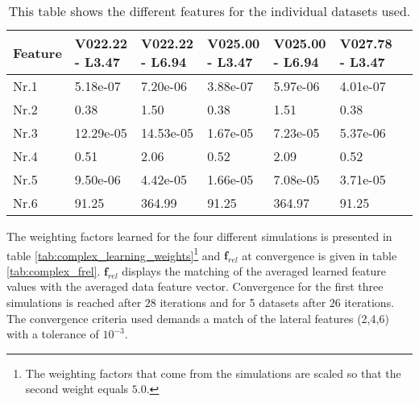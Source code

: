 \begin{table}[h!]
	\centering
	\begin{tabular}{@{}llllllr@{}} \toprule
	\textbf{Feature}     & V022.22 - L3.47 & 	V022.22 - L6.94 & V025.00 - L3.47 &	V025.00 - L6.94 & V027.78 - L3.47\\ \midrule
		Nr.1       		  &5.18e-07 &7.20e-06  	& 3.88e-07     & 5.97e-06  & 4.01e-07\\
		Nr.2              & 0.38 &1.50&	     0.38      & 1.51    &       0.38       \\
		Nr.3              & 12.29e-05&14.53e-05	& 1.67e-05 &	7.23e-05 &5.37e-06\\
		Nr.4              & 0.51 &2.06&	         0.52 &          2.09   &   0.52    \\
		Nr.5              & 9.50e-06&4.42e-05   & 1.66e-05      & 7.08e-05  & 3.71e-05       \\
		Nr.6              & 91.25 &	364.99      &	91.25	&364.97       & 91.25       \\ \bottomrule
	\end{tabular}
	\caption{This table shows the different features for the individual datasets used.}
	\label{tab:indi_features}
\end{table} 

The weighting factors learned for the four different simulations is presented in table \ref{tab:complex_learning_weights}\footnote{The weighting factors that come from the simulations are scaled so that the second weight equals $5.0$.} and $\bm{f}_{rel}$ at convergence is given in table \ref{tab:complex_frel}. $\bm{f}_{rel}$ displays the matching of the averaged learned feature values with the averaged data feature vector. Convergence for the first three simulations is reached after $28$ iterations and for 5 datasets after $26$ iterations. The convergence criteria used demands a match of the lateral features (2,4,6) with a tolerance of $10^{-3}$.\\

